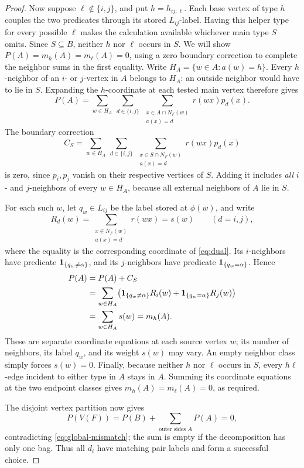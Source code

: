 \begin{proof}
Now suppose \(\ell\notin\{i,j\}\), and put \(h=h_{ij;\ell}\).
Each base vertex of type \(h\) couples the two predicates through its
stored \(L_{ij}\)-label. Having this helper type for every possible \(\ell\)
makes the calculation available whichever main type \(S\) omits.
Since \(S\subseteq B\), neither \(h\) nor \(\ell\) occurs in \(S\).
We will show \(P(A)=m_h(A)=m_\ell(A)=0\), using a zero boundary
correction to complete the neighbor sums in the first equality.
Write \(H_A=\{w\in A:a(w)=h\}\).
Every \(h\)-neighbor of an \(i\)- or \(j\)-vertex in \(A\) belongs to
\(H_A\): an outside neighbor would have to lie in \(S\).
Expanding the \(h\)-coordinate at each tested main vertex therefore gives
\[
P(A)=\sum_{w\in H_A}\ \sum_{d\in\{i,j\}}
       \ \sum_{\substack{x\in A\cap N_F(w)\\a(x)=d}}
                  r(wx)p_d(x).
\]
The boundary correction
\[
C_S=\sum_{w\in H_A}\ \sum_{d\in\{i,j\}}
       \ \sum_{\substack{x\in S\cap N_F(w)\\a(x)=d}}
                  r(wx)p_d(x)
\]
is zero, since \(p_i,p_j\) vanish on their respective vertices of \(S\).
Adding it includes \emph{all} \(i\)- and \(j\)-neighbors of every
\(w\in H_A\), because all external neighbors of \(A\) lie in \(S\).

For each such \(w\), let \(q_w\in L_{ij}\) be the label stored at
\(\phi(w)\), and write
\[
R_d(w)=\sum_{\substack{x\in N_F(w)\\a(x)=d}}r(wx)
       =s(w)\qquad(d=i,j),
\]
where the equality is the corresponding coordinate of
\eqref{eq:dual}.
Its \(i\)-neighbors have predicate \(\mathbf 1_{\{q_w\ne\alpha\}}\),
and its \(j\)-neighbors have predicate \(\mathbf 1_{\{q_w=\alpha\}}\).
Hence
\[
\begin{aligned}
P(A)
 &=P(A)+C_S\\
 &=\sum_{w\in H_A}
       \bigl(\mathbf 1_{\{q_w\ne\alpha\}}R_i(w)
               +\mathbf 1_{\{q_w=\alpha\}}R_j(w)\bigr)\\
 &=\sum_{w\in H_A}s(w)=m_h(A).
\end{aligned}
\]
These are separate coordinate equations at each source vertex \(w\);
its number of neighbors, its label \(q_w\), and its weight \(s(w)\)
may vary.  An empty neighbor class simply forces \(s(w)=0\).
Finally, because neither \(h\) nor \(\ell\) occurs in \(S\), every
\(h\ell\)-edge incident to either type in \(A\) stays in \(A\).
Summing its coordinate equations at the two endpoint classes gives
\(m_h(A)=m_\ell(A)=0\), as required.

The disjoint vertex partition now gives
\[
P(V(F))=P(B)+\sum_{\text{outer sides }A}P(A)=0,
\]
contradicting \eqref{eq:global-mismatch}; the sum is empty if the
decomposition has only one bag.
Thus all \(d_i\) have matching pair labels and form a successful choice.
\end{proof}

